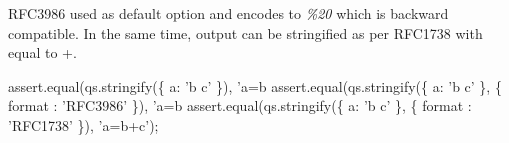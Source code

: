 R\+F\+C3986 used as default option and encodes \textquotesingle{} \textquotesingle{} to {\itshape \%20} which is backward compatible. In the same time, output can be stringified as per R\+F\+C1738 with \textquotesingle{} \textquotesingle{} equal to \textquotesingle{}+\textquotesingle{}.


\begin{DoxyCode}
assert.equal(qs.stringify(\{ a: 'b c' \}), 'a=b%
assert.equal(qs.stringify(\{ a: 'b c' \}, \{ format : 'RFC3986' \}), 'a=b%
assert.equal(qs.stringify(\{ a: 'b c' \}, \{ format : 'RFC1738' \}), 'a=b+c');
\end{DoxyCode}
 